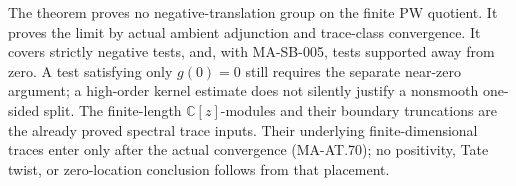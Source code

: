 The theorem proves no negative-translation group on the finite
PW quotient.  It proves the limit by actual ambient adjunction
and trace-class convergence.  It covers strictly negative tests,
and, with MA-SB-005, tests supported away from zero.
A test satisfying only \(g(0)=0\) still requires the separate
near-zero argument; a high-order kernel estimate does not
silently justify a nonsmooth one-sided split.
The finite-length \(\mathbb C[z]\)-modules and their boundary
truncations are the already proved spectral trace inputs.
Their underlying finite-dimensional traces enter only after
the actual convergence (MA-AT.70); no positivity, Tate twist,
or zero-location conclusion follows from that placement.
